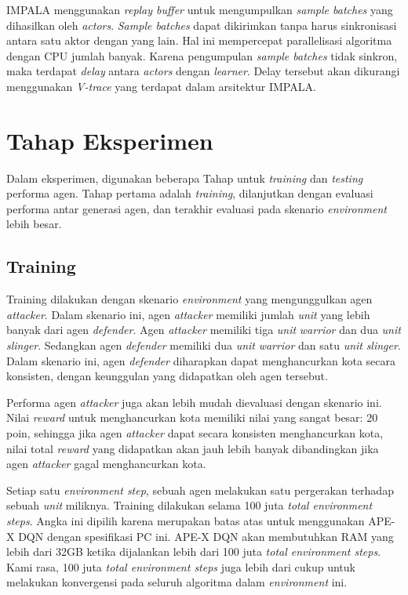 IMPALA menggunakan \emph{replay buffer} untuk mengumpulkan \emph{sample batches} yang dihasilkan oleh \emph{actors}.
\emph{Sample batches} dapat dikirimkan tanpa harus sinkronisasi antara satu aktor dengan yang lain.
Hal ini mempercepat parallelisasi algoritma dengan CPU jumlah banyak.
Karena pengumpulan \emph{sample batches} tidak sinkron, maka terdapat \emph{delay} antara \emph{actors} dengan \emph{learner}.
Delay tersebut akan dikurangi menggunakan \emph{V-trace} yang terdapat dalam arsitektur IMPALA.

\section{Tahap Eksperimen}
Dalam eksperimen, digunakan beberapa Tahap untuk \emph{training} dan \emph{testing} performa agen.
Tahap pertama adalah \emph{training}, dilanjutkan dengan evaluasi performa antar generasi agen, dan terakhir
evaluasi pada skenario \emph{environment} lebih besar.

\subsection{Training}
Training dilakukan dengan skenario \emph{environment} yang mengunggulkan agen \emph{attacker}.
Dalam skenario ini, agen \emph{attacker} memiliki jumlah \emph{unit} yang lebih banyak dari agen \emph{defender}.
Agen \emph{attacker} memiliki tiga \emph{unit} \emph{warrior} dan dua \emph{unit} \emph{slinger}.
Sedangkan agen \emph{defender} memiliki dua \emph{unit} \emph{warrior} dan satu \emph{unit} \emph{slinger}.
Dalam skenario ini, agen \emph{defender} diharapkan dapat menghancurkan kota secara konsisten, dengan keunggulan yang didapatkan oleh agen tersebut.

Performa agen \emph{attacker} juga akan lebih mudah dievaluasi dengan skenario ini.
Nilai \emph{reward} untuk menghancurkan kota memiliki nilai yang sangat besar: 20 poin, sehingga jika agen \emph{attacker}
dapat secara konsisten menghancurkan kota, nilai total \emph{reward} yang didapatkan akan jauh lebih banyak dibandingkan
jika agen \emph{attacker} gagal menghancurkan kota.

Setiap satu \emph{environment step}, sebuah agen melakukan satu pergerakan terhadap sebuah \emph{unit} miliknya.
Training dilakukan selama 100 juta \emph{total environment steps}.
Angka ini dipilih karena merupakan batas atas untuk menggunakan APE-X DQN dengan spesifikasi PC ini.
APE-X DQN akan membutuhkan RAM yang lebih dari 32GB ketika dijalankan lebih dari 100 juta \emph{total environment steps}.
Kami rasa, 100 juta \emph{total environment steps} juga lebih dari cukup untuk melakukan konvergensi pada seluruh algoritma
dalam \emph{environment} ini.

